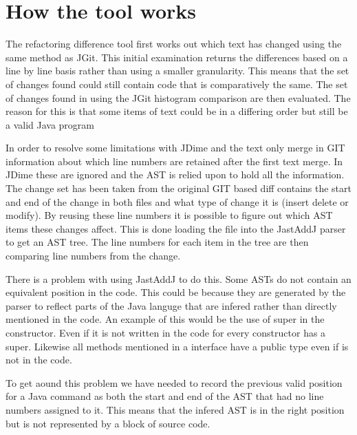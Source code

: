 
\section{How the tool works}

The refactoring difference tool first works out which text has changed using the same method as JGit.
This initial examination returns the differences based on a line by line basis rather than using a smaller granularity.
This means that the set of changes found could still contain code that is comparatively the same.
The set of changes found in using the JGit histogram comparison are then evaluated.
The reason for this is that some items of text could be in a differing order but still be a valid Java program


In order to resolve some limitations with JDime and the text only merge in GIT information about which line numbers are retained after the first text merge.  In JDime these are ignored and the AST is relied upon to hold all the information.  The change set has been taken from the original GIT based diff contains the start and end of the change in both files and what type of change it is (insert delete or modify).  By reusing these line numbers it is possible to figure out which AST items these changes affect. This is done loading the file into the JastAddJ parser to get an AST tree. The line numbers for each item in the tree are then comparing line numbers from the change.

There is a problem with using JastAddJ to do this. Some ASTs do not contain an equivalent position in the code.  This could be because they are generated by the parser to reflect parts of the Java languge that are infered rather than directly mentioned in the code.  An example of this would be the use of super in the constructor.  Even if it is not written in the code for every constructor has a super. Likewise all methods mentioned in a interface have a public type even if is not in the code.

To get aound this problem we have needed to record the previous valid position for a Java command as both the start and end of the AST that had no line numbers assigned to it.  This means that the infered AST is in the right position but is not represented by a block of source code.

